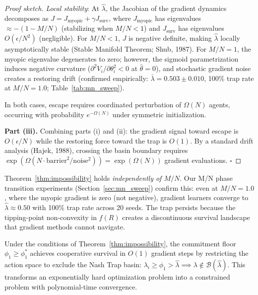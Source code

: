 \begin{proof}[Proof sketch]
\emph{Local stability}: At $\hat{\lambda}$, the Jacobian of the gradient dynamics decomposes as
$J = J_{\mathrm{myopic}} + \gamma J_{\mathrm{surv}}$,
where $J_{\mathrm{myopic}}$ has eigenvalues $\approx -(1-M/N)$ (stabilizing when $M/N < 1$)
and $J_{\mathrm{surv}}$ has eigenvalues $O(\epsilon / N^2)$ (negligible).
For $M/N < 1$, $J$ is negative definite, making $\hat{\lambda}$ locally asymptotically stable
(Stable Manifold Theorem; Shub, 1987).
For $M/N = 1$, the myopic eigenvalue degenerates to zero; however, the sigmoid parametrization induces
negative curvature ($\partial^2 V_i / \partial \theta_i^2 < 0$ at $\hat\theta = 0$),
and stochastic gradient noise creates a restoring drift (confirmed empirically:
$\bar\lambda = 0.503 \pm 0.010$, 100\% trap rate at $M/N{=}1.0$; Table~\ref{tab:mn_sweep}).

In both cases, escape requires coordinated perturbation of $\Omega(N)$ agents,
occurring with probability $e^{-\Omega(N)}$ under symmetric initialization.

\textbf{Part (iii).}
Combining parts (i) and (ii): the gradient signal toward escape is $O(\epsilon/N)$
while the restoring force toward the trap is $O(1)$.
By a standard drift analysis (Hajek, 1988),
crossing the basin boundary requires
$\exp(\Omega(N \cdot \mathrm{barrier}^2 / \mathrm{noise}^2)) = \exp(\Omega(N))$
gradient evaluations. \hfill $\square$
\end{proof}

\begin{remark}[M/N Independence]
\label{rem:mn_independence}
Theorem~\ref{thm:impossibility} holds \emph{independently of $M/N$}.
Our M/N phase transition experiments (Section~\ref{sec:mn_sweep})
confirm this: even at $M/N = 1.0$, where the myopic gradient is zero
(not negative), gradient learners converge to $\hat{\lambda} \approx 0.50$
with 100\% trap rate across 20 seeds.
The trap persists because the tipping-point non-convexity in $f(R)$
creates a discontinuous survival landscape that gradient methods cannot navigate.
\end{remark}

\begin{corollary}
\label{cor:bypass}
Under the conditions of Theorem~\ref{thm:impossibility},
the commitment floor $\phi_1 \geq \phi_1^*$
achieves cooperative survival in $O(1)$ gradient steps by restricting the
action space to exclude the Nash Trap basin:
$\lambda_i \geq \phi_1 > \hat{\lambda} \implies \lambda \notin \mathcal{B}(\hat{\lambda})$.
This transforms an exponentially hard optimization problem
into a constrained problem with polynomial-time convergence.
\end{corollary}


